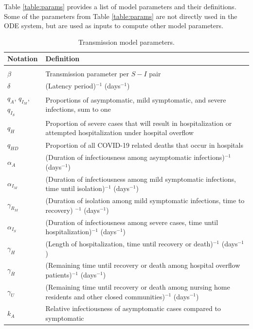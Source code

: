 \documentclass[11pt]{article}
\begin{document}
Table \ref{table:params} provides a list of model parameters and their definitions. Some of the parameters from Table \ref{table:params} are not directly used in the ODE system, but are used as inputs to compute other model parameters. 

\begingroup
\renewcommand\arraystretch{0.5}
\begin{table}[!htb] 
	\caption{Transmission model parameters.} 
	\vspace{.5em}
	\begin{tabular}{p{} p{} }
	\toprule
	Notation & Definition \\[0.5em] \hline \\
	$\beta$ & Transmission parameter per $S-I$ pair \\[0.5em]
	$\delta$ & (Latency period)$^{-1}$ (days$^{-1}$) \\[0.5em]
	$q_A$, $q_{I_M}$, $q_{I_S}$  & Proportions of asymptomatic, mild symptomatic, and severe infections, sum to one \\[0.5em]
	$q_H$ & Proportion of severe cases that will result in hospitalization or attempted hospitalization under hospital overflow \\ [0.5em]
	$q_{HD}$ & Proportion of all COVID-19 related deaths that occur in hospitals \\ [0.5em]
	$\alpha_A$ & (Duration of infectiousness among asymptomatic infections)$^{-1}$ (days$^{-1}$) \\[0.5em]	
	$\alpha_{I_M}$ & (Duration of infectiousness among mild symptomatic infections, time until isolation)$^{-1}$ (days$^{-1}$) \\[0.5em]
	$\gamma_{R_M}$ & (Duration of isolation among mild symptomatic infections, time to recovery)	$^{-1}$ (days$^{-1}$) \\[0.5em]
	$\alpha_{I_S}$ & (Duration of infectiousness among severe cases, time until hospitalization)$^{-1}$ (days$^{-1}$) \\[0.5em]	
	$\gamma_{H}$ & (Length of hospitalization, time until recovery or death)$^{-1}$ (days$^{-1}$) \\[0.5em]
	$\gamma_{\bar{H}}$ & (Remaining time until recovery or death among hospital overflow patients)$^{-1}$ (days$^{-1}$) \\[0.5em]
	$\gamma_{U}$ & (Remaining time until recovery or death among nursing home residents and other closed communities)$^{-1}$ (days$^{-1}$) \\[0.5em]
	$k_A$ & Relative infectiousness of asymptomatic cases compared to symptomatic \\[0.5em]

\end{tabular}
\end{table}
\end{document}
